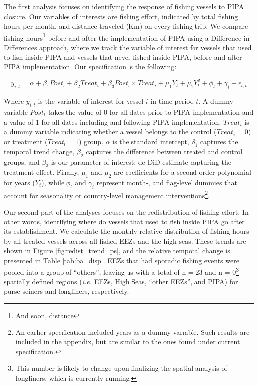 \documentclass[12pt,]{article}
\let\rmarkdownfootnote\footnote%
\def\footnote{\protect\rmarkdownfootnote}
\begin{document}
The first analysis focuses on identifying the response of fishing
vessels to PIPA closure. Our variables of interests are fishing effort,
indicated by total fishing hours per month, and distance traveled (Km)
on every fishing trip. We compare fishing hours\footnote{And soon,
  distance} before and after the implementation of PIPA using a
Difference-in-Differences approach, where we track the variable of
interest for vessels that used to fish inside PIPA and vessels that
never fished inside PIPA, before and after PIPA implementation. Our
specification is the following:

\[
y_{i,t} = \alpha + \beta_1 Post_t + \beta_2 Treat_i + \beta_3 Post_t \times Treat_i + \mu_1Y_t + \mu_2Y_t^2 + \phi_t + \gamma_i + \epsilon_{i,t}
\]

Where \(y_{i,t}\) is the variable of interest for vessel \(i\) in time
period \(t\). A dummy variable \(Post_t\) takes the value of 0 for all
dates prior to PIPA implementation and a value of 1 for all dates
including and following PIPA implementation. \(Treat_i\) is a dummy
variable indicating whether a vessel belongs to the control
(\(Treat_i = 0\)) or treatment (\(Treat_i = 1\)) group. \(\alpha\) is
the standard intercept, \(\beta_1\) captures the temporal trend change,
\(\beta_2\) captures the difference between treated and control groups,
and \(\beta_3\) is our parameter of interest: de DiD estimate capturing
the treatment effect. Finally, \(\mu_1\) and \(\mu_2\) are coefficients
for a second order polynomial for years (\(Y_t\)), while \(\phi_t\) and
\(\gamma_i\) represent month-, and flag-level dummies that account for
seasonality or country-level management interventions\footnote{An
  earlier specification included years as a dummy variable. Such results
  are included in the appendix, but are similar to the ones found under
  current specification.}.

Our second part of the analyses focuses on the redistribution of fishing
effort. In other words, identifying where do vessels that used to fish
inside PIPA go after its establishment. We calculate the monthly
relative distribution of fishing hours by all treated vessels across all
fished EEZs and the high seas. These trends are shown in Figure
\ref{fig:redist_trend_ps}, and the relative temporal change is presented
in Table \ref{tab:ba_disp}. EEZs that had sporadic fishing events were
pooled into a group of ``others'', leaving us with a total of n = 23 and
n = 0\footnote{This number is likely to change upon finalizing the
  spatial analysis of longliners, which is currently running.} spatially
defined regions (\emph{i.e.} EEZs, High Seas, ``other EEZs'', and PIPA)
for purse seiners and longliners, respectively.
\end{document}
